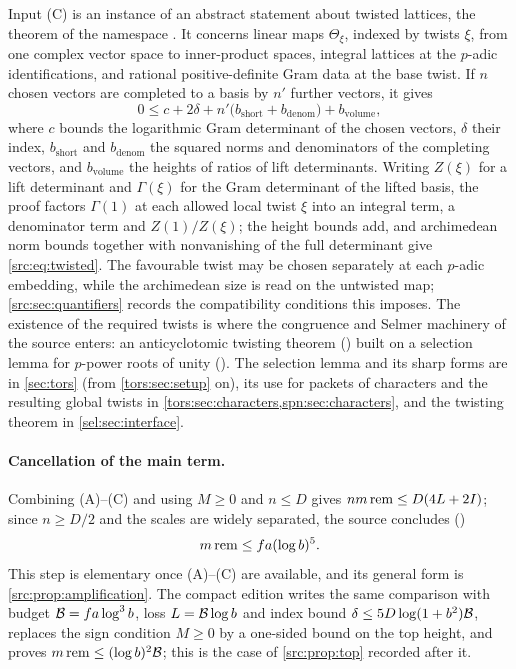 Input (C) is an instance of an abstract statement about twisted lattices, the theorem
 of the namespace . It concerns
linear maps $\Theta_\xi$,
indexed by twists $\xi$, from one complex vector space to inner-product spaces, integral
lattices at the $p$-adic identifications, and rational positive-definite Gram data at the base
twist. If $n$ chosen vectors are completed to a basis by $n'$ further vectors, it gives
\begin{equation}\label{src:eq:twisted}
0\le c+2\delta+n'\bigl(b_{\mathrm{short}}+b_{\mathrm{denom}}\bigr)+b_{\mathrm{volume}},
\end{equation}
where $c$ bounds the logarithmic Gram determinant of the chosen vectors, $\delta$ their index,
$b_{\mathrm{short}}$ and $b_{\mathrm{denom}}$ the squared norms and denominators of the
completing vectors, and $b_{\mathrm{volume}}$ the heights of ratios of lift determinants.
Writing $Z(\xi)$ for a lift determinant and $\Gamma(\xi)$ for the Gram determinant of the
lifted basis, the proof factors $\Gamma(1)$ at each allowed local twist $\xi$ into an integral
term, a denominator term and $Z(1)/Z(\xi)$; the height bounds add, and archimedean norm bounds
together with nonvanishing of the full determinant give \eqref{src:eq:twisted}. The favourable
twist may be chosen separately at each $p$-adic embedding, while the archimedean size is read
on the untwisted map; \cref{src:sec:quantifiers} records the compatibility conditions this
imposes. The existence of the required twists is where the congruence and Selmer machinery
of the source enters: an anticyclotomic twisting theorem
() built on a selection lemma for $p$-power
roots of unity (). The selection lemma and its sharp forms are in
\cref{sec:tors} (from \cref{tors:sec:setup} on), its use for packets of characters and the
resulting global twists in \cref{tors:sec:characters,spn:sec:characters}, and the twisting
theorem in \cref{sel:sec:interface}.

\paragraph{Cancellation of the main term.}
Combining (A)--(C) and using $M\ge0$ and $n\le D$ gives $nm\,\mathrm{rem}\le D(4L+2I)$; since
$n\ge D/2$ and the scales are widely separated, the source concludes
()
\begin{equation}\label{src:eq:star}
m\,\mathrm{rem}\le fa(\log b)^5 .
\end{equation}
This step is elementary once (A)--(C) are available, and its general form is
\cref{src:prop:amplification}. The compact edition writes the same comparison with budget
$\mathcal{B}=fa\log^3b$, loss $L=\mathcal{B}\log b$ and index bound $\delta\le5D\log(1+b^2)\mathcal{B}$, replaces
the sign condition $M\ge0$ by a one-sided bound on the top height, and proves
$m\,\mathrm{rem}\le(\log b)^2\mathcal{B}$; this is the case of \cref{src:prop:top} recorded after it.

